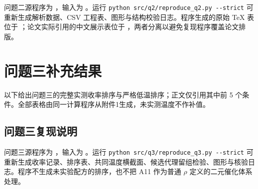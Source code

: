 问题二源程序为 ，输入为
。运行
\nolinkurl{python src/q2/reproduce_q2.py --strict}
可重新生成解析数据、CSV 工程表、图形与结构校验日志。程序生成的原始 TeX 表位于
；论文实际引用的中文展示表位于
，两者分离以避免复现程序覆盖论文排版。

\clearpage
\section{问题三补充结果}
\label{app:q3-results}

以下给出问题三的完整实测收率排序与严格低温排序；正文仅引用其中前 5 个条件。全部表格由同一计算程序从附件1生成，未实测温度不作补值。




\subsection{问题三复现说明}

问题三源程序为 ，输入为
。运行
\nolinkurl{python src/q3/reproduce_q3.py --strict}
可重新生成收率记录、排序表、共同温度横截面、候选代理留组检验、图形与核验日志。程序不生成未实验配方的排序，也不把 A11 作为普通 $\rho$ 定义的二元催化体系处理。
